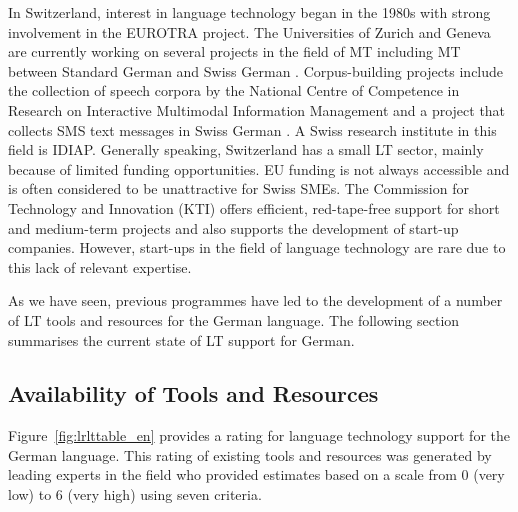 \documentclass[]{../../metanetpaper}
\begin{document}
\begin{multicols}{2}
    In Switzerland, interest in language technology began in the 1980s with strong involvement in the EUROTRA project. The Universities of Zurich and Geneva are currently working on several projects in the field of MT including MT between Standard German and Swiss German \cite{latl1}. Corpus-building projects include the collection of speech corpora by the National Centre of Competence in Research on Interactive Multimodal Information Management and a project that collects SMS text messages in Swiss German \cite{sor1}. A Swiss research institute in this field is IDIAP. Generally speaking, Switzerland has a small LT sector, mainly because of limited funding opportunities. EU funding is not always accessible and is often considered to be unattractive for Swiss SMEs. The Commission for Technology and Innovation (KTI) offers efficient, red-tape-free support for short and medium-term projects and also supports the development of start-up companies. However, start-ups in the field of language technology are rare due to this lack of relevant expertise.

As we have seen, previous programmes have led to the development of a number of LT tools and resources for the German language. The following section summarises the current state of LT support for German.
  
\subsection{Availability of Tools and Resources}

Figure~\ref{fig:lrlttable_en} provides a rating for language technology support for the German language. This rating of existing tools and resources was generated by leading experts in the field who provided estimates based on a scale from 0 (very low) to 6 (very high) using seven criteria.


\end{multicols}
\end{document}

